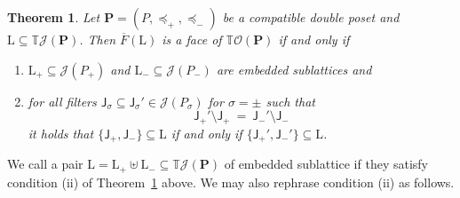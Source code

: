 \documentclass[11pt]{amsart}
\newtheorem{thm}{Theorem}[section]
\theoremstyle{definition}
\begin{document}
\begin{thm}\label{thm:TO_faces}
    Let ${\mathbf{P}} = ({P},\preceq_+,\preceq_-)$ be a compatible double poset and
    ${\mathrm{L}} \subseteq {{\mathbb{T}}{{\mathcal{J}}({{\mathbf{P}}})}}$. Then ${\overline{F}({\mathrm{L}})}$ is a face of
    ${{\mathbb{T}}{\mathcal{O}({\mathbf{P}})}}$ if and only if
    \begin{enumerate}[\rm (i)]
        \item ${\mathrm{L}}_+ \subseteq {{\mathcal{J}}({{P}_+})}$ and ${\mathrm{L}}_- \subseteq {{\mathcal{J}}({{P}_-})}$
            are embedded sublattices and
        \item for all filters ${\mathsf{J}}_\sigma \subseteq {\mathsf{J}}_\sigma' \in
            {{\mathcal{J}}({{P}_\sigma})}$ for $\sigma = \pm$ such that 
            \[
                {\mathsf{J}}_+' \setminus {\mathsf{J}}_+ \ = \ {\mathsf{J}}_-' \setminus
                {\mathsf{J}}_-
            \]
            it holds that $\{{\mathsf{J}}_+,{\mathsf{J}}_-\} \subseteq {\mathrm{L}}$ if and only if 
            $\{{\mathsf{J}}_+',{\mathsf{J}}_-'\} \subseteq {\mathrm{L}}$.
    \end{enumerate}
\end{thm}

We call a pair ${\mathrm{L}} = {\mathrm{L}}_+ \uplus {\mathrm{L}}_- \subseteq {{\mathbb{T}}{{\mathcal{J}}({{\mathbf{P}}})}}$ of embedded
sublattice {\textbf{\color{black}{cooperating}}} if they satisfy condition (ii) of
Theorem~\ref{thm:TO_faces} above.  We may also rephrase condition (ii) as
follows.
\end{document}
